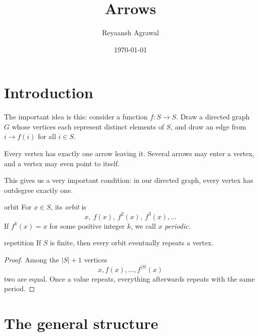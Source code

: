 \documentclass[11pt]{scrartcl}
\title{Arrows}
\author{Reyaansh Agrawal}
\date{\today}
\begin{document}
\maketitle
\vspace{-1.1em}


\tableofcontents

\section{Introduction}

The important idea is this: consider a function \(f:S\rightarrow S\). 
Draw a directed graph \(G\) whose vertices each represent distinct
elements of \(S\), and draw an edge from \(i\rightarrow f(i)\) for all \(i\in S\).

Every vertex has exactly one arrow leaving it. Several arrows may enter a vertex, and a vertex may even point to itself.

\begin{center}
\end{center}

This gives us a very important condition: in our directed graph, every vertex has outdegree exactly one.

\begin{definition}{}{orbit}
For \(x\in S\), its \emph{orbit} is \[x,\ f(x),\ f^2(x),\ f^3(x),\dots\]
If \(f^k(x)=x\) for some positive integer \(k\), we call \(x\) \emph{periodic}.
\end{definition}

\begin{claim}{}{repetition}
If \(S\) is finite, then every orbit eventually repeats a vertex.
\end{claim}

\begin{proof}
Among the \(|S|+1\) vertices \[x,f(x),\dots,f^{|S|}(x)\]
two are equal. Once a value repeats, everything afterwards repeats with the same period.
\end{proof}

\section{The general structure}
\end{document}

